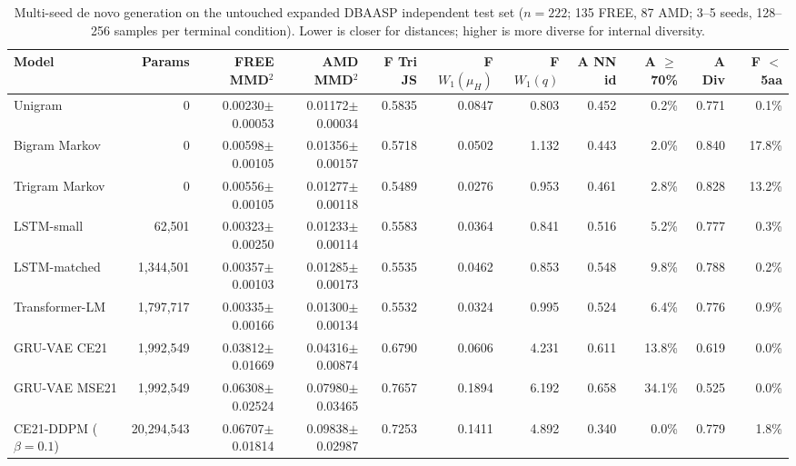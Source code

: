 \documentclass[unnumsec,webpdf,contemporary,large]{oup-authoring-template}
\newcommand{\rev}[1]{#1}
\begin{document}
\begin{table}[t]
\caption{\rev{Multi-seed de novo generation on the untouched expanded DBAASP independent test set ($n=222$; 135 FREE, 87 AMD; 3--5 seeds, 128--256 samples per terminal condition). Lower is closer for distances; higher is more diverse for internal diversity.}}
\label{tab:generation_expanded}
\centering
\footnotesize
\begin{tabular}{lrrrrrrrrrr}
\toprule
\rev{Model} & \rev{Params} & \rev{FREE MMD$^2$} & \rev{AMD MMD$^2$} & \rev{F Tri JS} & \rev{F $W_1(\mu_H)$} & \rev{F $W_1(q)$} & \rev{A NN id} & \rev{A $\geq$70\%} & \rev{A Div} & \rev{F $<$5aa} \\
\midrule
\rev{Unigram} & \rev{0} & \rev{0.00230$\pm$0.00053} & \rev{0.01172$\pm$0.00034} & \rev{0.5835} & \rev{0.0847} & \rev{0.803} & \rev{0.452} & \rev{0.2\%} & \rev{0.771} & \rev{0.1\%} \\
\rev{Bigram Markov} & \rev{0} & \rev{0.00598$\pm$0.00105} & \rev{0.01356$\pm$0.00157} & \rev{0.5718} & \rev{0.0502} & \rev{1.132} & \rev{0.443} & \rev{2.0\%} & \rev{0.840} & \rev{17.8\%} \\
\rev{Trigram Markov} & \rev{0} & \rev{0.00556$\pm$0.00105} & \rev{0.01277$\pm$0.00118} & \rev{0.5489} & \rev{0.0276} & \rev{0.953} & \rev{0.461} & \rev{2.8\%} & \rev{0.828} & \rev{13.2\%} \\
\rev{LSTM-small} & \rev{62,501} & \rev{0.00323$\pm$0.00250} & \rev{0.01233$\pm$0.00114} & \rev{0.5583} & \rev{0.0364} & \rev{0.841} & \rev{0.516} & \rev{5.2\%} & \rev{0.777} & \rev{0.3\%} \\
\rev{LSTM-matched} & \rev{1,344,501} & \rev{0.00357$\pm$0.00103} & \rev{0.01285$\pm$0.00173} & \rev{0.5535} & \rev{0.0462} & \rev{0.853} & \rev{0.548} & \rev{9.8\%} & \rev{0.788} & \rev{0.2\%} \\
\rev{Transformer-LM} & \rev{1,797,717} & \rev{0.00335$\pm$0.00166} & \rev{0.01300$\pm$0.00134} & \rev{0.5532} & \rev{0.0324} & \rev{0.995} & \rev{0.524} & \rev{6.4\%} & \rev{0.776} & \rev{0.9\%} \\
\rev{GRU-VAE CE21} & \rev{1,992,549} & \rev{0.03812$\pm$0.01669} & \rev{0.04316$\pm$0.00874} & \rev{0.6790} & \rev{0.0606} & \rev{4.231} & \rev{0.611} & \rev{13.8\%} & \rev{0.619} & \rev{0.0\%} \\
\rev{GRU-VAE MSE21} & \rev{1,992,549} & \rev{0.06308$\pm$0.02524} & \rev{0.07980$\pm$0.03465} & \rev{0.7657} & \rev{0.1894} & \rev{6.192} & \rev{0.658} & \rev{34.1\%} & \rev{0.525} & \rev{0.0\%} \\
\rev{CE21-DDPM ($\beta=0.1$)} & \rev{20,294,543} & \rev{0.06707$\pm$0.01814} & \rev{0.09838$\pm$0.02987} & \rev{0.7253} & \rev{0.1411} & \rev{4.892} & \rev{0.340} & \rev{0.0\%} & \rev{0.779} & \rev{1.8\%} \\

\end{tabular}
\end{table}
\end{document}
